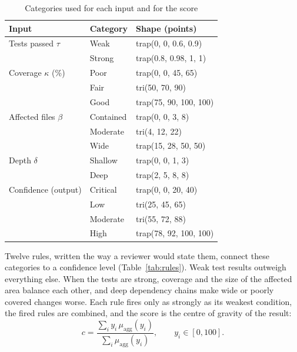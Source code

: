 \documentclass[conference]{IEEEtran}
\begin{document}
\begin{table}[t]
\caption{Categories used for each input and for the score}
\label{tab:mf}
\centering
\small
\begin{tabular}{@{}llp{3.2cm}@{}}
\toprule
\textbf{Input} & \textbf{Category} & \textbf{Shape (points)} \\
\midrule
Tests passed $\tau$ & Weak & trap(0, 0, 0.6, 0.9) \\
 & Strong & trap(0.8, 0.98, 1, 1) \\
\midrule
Coverage $\kappa$ (\%) & Poor & trap(0, 0, 45, 65) \\
 & Fair & tri(50, 70, 90) \\
 & Good & trap(75, 90, 100, 100) \\
\midrule
Affected files $\beta$ & Contained & trap(0, 0, 3, 8) \\
 & Moderate & tri(4, 12, 22) \\
 & Wide & trap(15, 28, 50, 50) \\
\midrule
Depth $\delta$ & Shallow & trap(0, 0, 1, 3) \\
 & Deep & trap(2, 5, 8, 8) \\
\midrule
Confidence (output) & Critical & trap(0, 0, 20, 40) \\
 & Low & tri(25, 45, 65) \\
 & Moderate & tri(55, 72, 88) \\
 & High & trap(78, 92, 100, 100) \\
\bottomrule
\end{tabular}
\end{table}

Twelve rules, written the way a reviewer would state them, connect these categories to a confidence level (Table~\ref{tab:rules}). Weak test results outweigh everything else. When the tests are strong, coverage and the size of the affected area balance each other, and deep dependency chains make wide or poorly covered changes worse. Each rule fires only as strongly as its weakest condition, the fired rules are combined, and the score is the centre of gravity of the result:
\begin{equation}
    c = \frac{\sum_i y_i \, \mu_{\text{agg}}(y_i)}{\sum_i \mu_{\text{agg}}(y_i)}, \qquad y_i \in [0,100].
\end{equation}
\end{document}
